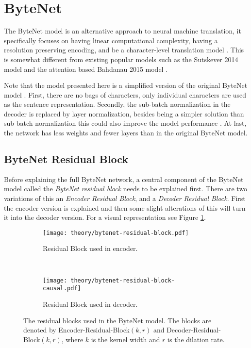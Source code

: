 \section{ByteNet}
\label{sec:theory:bytenet}

The ByteNet model is an alternative approach to neural machine translation, it specifically focuses on having linear computational complexity, having a resolution preserving encoding, and be a character-level translation model \cite{bytenet}. This is somewhat different from existing popular models such as the Sutskever 2014 model \cite{sutskever-2014-nmt} and the attention based Bahdanau 2015 model \cite{bahdanau-2015-nmt}.

Note that the model presented here is a simplified version of the original ByteNet model \cite{bytenet}. First, there are no bags of characters, only individual characters are used as the sentence representation. Secondly, the sub-batch normalization in the decoder is replaced by layer normalization, besides being a simpler solution than sub-batch normalization this could also improve the model performance \cite{layer-normalization}. At last, the network has less weights and fewer layers than in the original ByteNet model.

\subsection{ByteNet Residual Block}

Before explaining the full ByteNet network, a central component of the ByteNet model called the \textit{ByteNet residual block} needs to be explained first. There are two variations of this an \textit{Encoder Residual Block}, and a \textit{Decoder Residual Block}. First the encoder version is explained and then some slight alterations of this will turn it into the decoder version. For a visual representation see Figure \ref{fig:bytenet:residual-block}.

\begin{figure}[h]
    \centering
    \begin{subfigure}[b]{0.45\textwidth}
        \centering
        \texttt{[image: theory/bytenet-residual-block.pdf]}
        \caption{Residual Block used in encoder.}
    \end{subfigure}
    ~ %
    \begin{subfigure}[b]{0.45\textwidth}
        \centering
        \texttt{[image: theory/bytenet-residual-block-causal.pdf]}
        \caption{Residual Block used in decoder.}
    \end{subfigure}
    \caption{The residual blocks used in the ByteNet model. The blocks are denoted by Encoder-Residual-Block$(k,r)$ and Decoder-Residual-Block$(k,r)$, where $k$ is the kernel width and $r$ is the dilation rate.}
    \label{fig:bytenet:residual-block}
\end{figure}

